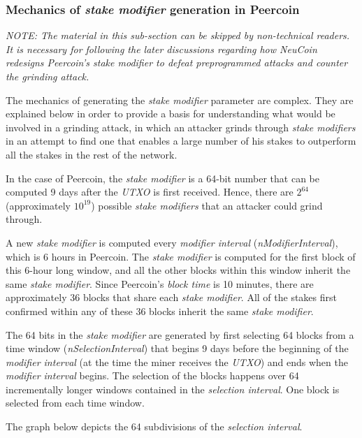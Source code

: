 \documentclass[a4paper,11pt]{article}
\begin{document}
\subsubsection*{Mechanics of \textit{stake modifier} generation in Peercoin}

\textit{NOTE: The material in this sub-section can be skipped by non-technical readers. It is necessary for following the later discussions regarding how NeuCoin redesigns Peercoin's \textit{stake modifier} to defeat preprogrammed attacks and counter the grinding attack.}

The mechanics of generating the \textit{stake modifier} parameter are complex. They are explained below in order to provide a basis for understanding what would be involved in a grinding attack, in which an attacker grinds through \textit{stake modifiers} in an attempt to find one that enables a large number of his stakes to outperform all the stakes in the rest of the network.

In the case of Peercoin, the \textit{stake modifier} is a 64-bit number that can be computed 9 days after the \textit{UTXO} is first received. Hence, there are $2^{64}$ (approximately $10^{19}$) possible \textit{stake modifiers} that an attacker could grind through.

A new \textit{stake modifier} is computed every \textit{modifier interval} (\textit{nModifierInterval}), which is 6 hours in Peercoin. The \textit{stake modifier} is computed for the first block of this 6-hour long window, and all the other blocks within this window inherit the same \textit{stake modifier}. Since Peercoin's \textit{block time} is 10 minutes, there are approximately 36 blocks that share each \textit{stake modifier}. All of the stakes first confirmed within any of these 36 blocks inherit the same \textit{stake modifier}.

The 64 bits in the \textit{stake modifier} are generated by first selecting 64 blocks from a time window (\textit{nSelectionInterval}) that begins 9 days before the beginning of the \textit{modifier interval} (at the time the miner receives the \textit{UTXO}) and ends when the \textit{modifier interval} begins. The selection of the blocks happens over 64 incrementally longer windows contained in the \textit{selection interval}. One block is selected from each time window. 

The graph below depicts the 64 subdivisions of the \textit{selection interval}.
\end{document}
